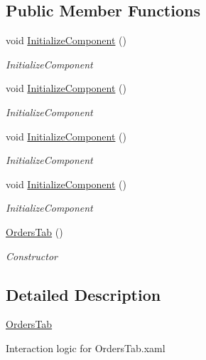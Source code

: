 \subsection*{Public Member Functions}
\begin{DoxyCompactItemize}
\item 
void \hyperlink{class_baudi_1_1_client_1_1_view_1_1_tabs_1_1_orders_tab_a8acb10a62a54dfcbfb273335ee530314}{Initialize\+Component} ()
\begin{DoxyCompactList}\small\item\em Initialize\+Component \end{DoxyCompactList}\item 
void \hyperlink{class_baudi_1_1_client_1_1_view_1_1_tabs_1_1_orders_tab_a8acb10a62a54dfcbfb273335ee530314}{Initialize\+Component} ()
\begin{DoxyCompactList}\small\item\em Initialize\+Component \end{DoxyCompactList}\item 
void \hyperlink{class_baudi_1_1_client_1_1_view_1_1_tabs_1_1_orders_tab_a8acb10a62a54dfcbfb273335ee530314}{Initialize\+Component} ()
\begin{DoxyCompactList}\small\item\em Initialize\+Component \end{DoxyCompactList}\item 
void \hyperlink{class_baudi_1_1_client_1_1_view_1_1_tabs_1_1_orders_tab_a8acb10a62a54dfcbfb273335ee530314}{Initialize\+Component} ()
\begin{DoxyCompactList}\small\item\em Initialize\+Component \end{DoxyCompactList}\item 
\hyperlink{class_baudi_1_1_client_1_1_view_1_1_tabs_1_1_orders_tab_a271e3b6a455caaa50a20d3e68aaa4e38}{Orders\+Tab} ()
\begin{DoxyCompactList}\small\item\em Constructor \end{DoxyCompactList}\end{DoxyCompactItemize}


\subsection{Detailed Description}
\hyperlink{class_baudi_1_1_client_1_1_view_1_1_tabs_1_1_orders_tab}{Orders\+Tab} 

Interaction logic for Orders\+Tab.\+xaml 

